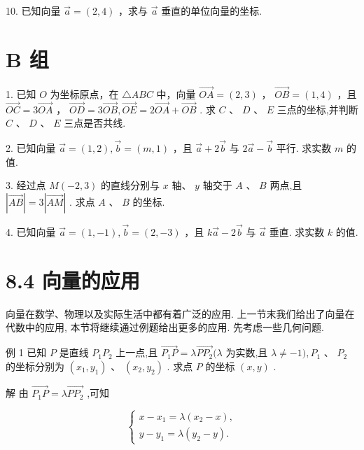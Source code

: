 \documentclass[10pt]{article}
\begin{document}
10. 已知向量 \(\overrightarrow{a} = \left( {2,4}\right)\) ，求与 \(\overrightarrow{a}\) 垂直的单位向量的坐标.

\section*{B 组}

1. 已知 \(O\) 为坐标原点，在 \(\bigtriangleup  {ABC}\) 中，向量 \(\overrightarrow{OA} = \left( {2,3}\right)\) ， \(\overrightarrow{OB} = \left( {1,4}\right)\) ，且 \(\overrightarrow{OC} = 3\overrightarrow{OA}\) ， \(\overrightarrow{OD} = 3\overrightarrow{OB},\overrightarrow{OE} = 2\overrightarrow{OA} + \overrightarrow{OB}\) . 求 \(C\text{ 、 }D\text{ 、 }E\) 三点的坐标,并判断 \(C\text{ 、 }D\text{ 、 }E\) 三点是否共线.

2. 已知向量 \(\overrightarrow{a} = \left( {1,2}\right) ,\overrightarrow{b} = \left( {m,1}\right)\) ，且 \(\overrightarrow{a} + 2\overrightarrow{b}\) 与 \(2\overrightarrow{a} - \overrightarrow{b}\) 平行. 求实数 \(m\) 的值.

3. 经过点 \(M\left( {-2,3}\right)\) 的直线分别与 \(x\) 轴、 \(y\) 轴交于 \(A\text{ 、 }B\) 两点,且 \(\left| \overrightarrow{AB}\right|  = 3\left| \overrightarrow{AM}\right|\) . 求点 \(A\text{ 、 }B\) 的坐标.

4. 已知向量 \(\overrightarrow{a} = \left( {1, - 1}\right) ,\overrightarrow{b} = \left( {2, - 3}\right)\) ，且 \(k\overrightarrow{a} - 2\overrightarrow{b}\) 与 \(\overrightarrow{a}\) 垂直. 求实数 \(k\) 的值.

\section*{8.4 向量的应用}

向量在数学、物理以及实际生活中都有着广泛的应用. 上一节末我们给出了向量在代数中的应用, 本节将继续通过例题给出更多的应用. 先考虑一些几何问题.

例 1 已知 \(P\) 是直线 \({P}_{1}{P}_{2}\) 上一点,且 \(\overrightarrow{{P}_{1}P} = \lambda \overrightarrow{P{P}_{2}}(\lambda\) 为实数,且 \(\lambda  \neq   - 1),{P}_{1}\text{ 、 }{P}_{2}\) 的坐标分别为 \(\left( {{x}_{1},{y}_{1}}\right) \text{ 、 }\left( {{x}_{2},{y}_{2}}\right)\) . 求点 \(P\) 的坐标 \(\left( {x,y}\right)\) .

解 由 \(\overrightarrow{{P}_{1}P} = \lambda \overrightarrow{P{P}_{2}}\) ,可知

\[
\left\{  \begin{array}{l} x - {x}_{1} = \lambda \left( {{x}_{2} - x}\right) , \\  y - {y}_{1} = \lambda \left( {{y}_{2} - y}\right) . \end{array}\right.
\]
\end{document}
